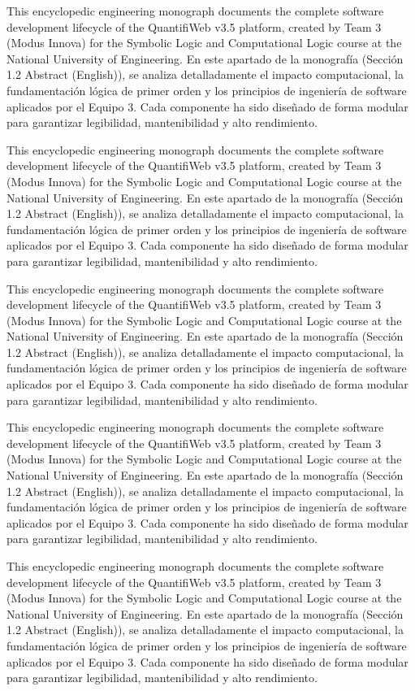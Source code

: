\documentclass[11pt,a4paper]{article}
\begin{document}
This encyclopedic engineering monograph documents the complete software
development lifecycle of the QuantifiWeb v3.5 platform, created by Team
3 (Modus Innova) for the Symbolic Logic and Computational Logic course
at the National University of Engineering. En este apartado de la
monografía (Sección 1.2 Abstract (English)), se analiza detalladamente
el impacto computacional, la fundamentación lógica de primer orden y los
principios de ingeniería de software aplicados por el Equipo 3. Cada
componente ha sido diseñado de forma modular para garantizar
legibilidad, mantenibilidad y alto rendimiento.

This encyclopedic engineering monograph documents the complete software
development lifecycle of the QuantifiWeb v3.5 platform, created by Team
3 (Modus Innova) for the Symbolic Logic and Computational Logic course
at the National University of Engineering. En este apartado de la
monografía (Sección 1.2 Abstract (English)), se analiza detalladamente
el impacto computacional, la fundamentación lógica de primer orden y los
principios de ingeniería de software aplicados por el Equipo 3. Cada
componente ha sido diseñado de forma modular para garantizar
legibilidad, mantenibilidad y alto rendimiento.

This encyclopedic engineering monograph documents the complete software
development lifecycle of the QuantifiWeb v3.5 platform, created by Team
3 (Modus Innova) for the Symbolic Logic and Computational Logic course
at the National University of Engineering. En este apartado de la
monografía (Sección 1.2 Abstract (English)), se analiza detalladamente
el impacto computacional, la fundamentación lógica de primer orden y los
principios de ingeniería de software aplicados por el Equipo 3. Cada
componente ha sido diseñado de forma modular para garantizar
legibilidad, mantenibilidad y alto rendimiento.

This encyclopedic engineering monograph documents the complete software
development lifecycle of the QuantifiWeb v3.5 platform, created by Team
3 (Modus Innova) for the Symbolic Logic and Computational Logic course
at the National University of Engineering. En este apartado de la
monografía (Sección 1.2 Abstract (English)), se analiza detalladamente
el impacto computacional, la fundamentación lógica de primer orden y los
principios de ingeniería de software aplicados por el Equipo 3. Cada
componente ha sido diseñado de forma modular para garantizar
legibilidad, mantenibilidad y alto rendimiento.

This encyclopedic engineering monograph documents the complete software
development lifecycle of the QuantifiWeb v3.5 platform, created by Team
3 (Modus Innova) for the Symbolic Logic and Computational Logic course
at the National University of Engineering. En este apartado de la
monografía (Sección 1.2 Abstract (English)), se analiza detalladamente
el impacto computacional, la fundamentación lógica de primer orden y los
principios de ingeniería de software aplicados por el Equipo 3. Cada
componente ha sido diseñado de forma modular para garantizar
legibilidad, mantenibilidad y alto rendimiento.
\end{document}
